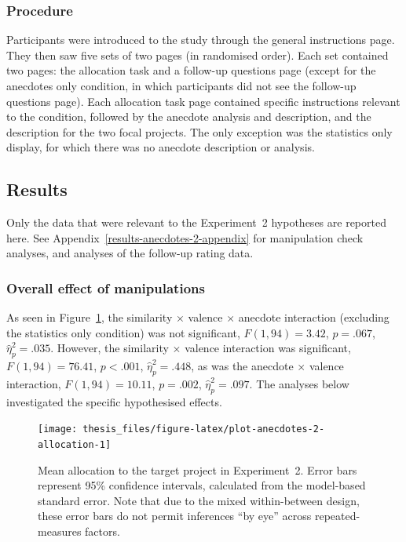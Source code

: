 \documentclass[a4paper, nobind, dvipsnames]{templates/ociamthesis}
\theoremstyle{definition}
\theoremstyle{definition}
\theoremstyle{definition}
\theoremstyle{definition}
\theoremstyle{remark}
\begin{document}
\subsubsection{Procedure}

Participants were introduced to the study through the general instructions page.
They then saw five sets of two pages (in randomised order). Each set contained
two pages: the allocation task and a follow-up questions page (except for the
anecdotes only condition, in which participants did not see the follow-up
questions page). Each allocation task page contained specific instructions
relevant to the condition, followed by the anecdote analysis and description,
and the description for the two focal projects. The only exception was the
statistics only display, for which there was no anecdote description or
analysis.

\subsection{Results}

Only the data that were relevant to the Experiment~2 hypotheses are reported
here. See Appendix~\ref{results-anecdotes-2-appendix} for manipulation check
analyses, and analyses of the follow-up rating data.

\subsubsection{Overall effect of manipulations}

As seen in Figure~\ref{fig:plot-anecdotes-2-allocation}, the similarity
\(\times\) valence \(\times\) anecdote interaction (excluding the statistics only
condition) was not significant,
\(F(1, 94) = 3.42\), \(p = .067\), \(\hat{\eta}^2_p = .035\). However,
the similarity \(\times\) valence interaction was significant,
\(F(1, 94) = 76.41\), \(p < .001\), \(\hat{\eta}^2_p = .448\), as was the anecdote
\(\times\) valence interaction,
\(F(1, 94) = 10.11\), \(p = .002\), \(\hat{\eta}^2_p = .097\). The analyses below investigated the specific hypothesised effects.



\begin{figure}
\texttt{[image: thesis\_files/figure-latex/plot-anecdotes-2-allocation-1]} \caption{Mean allocation to the target project in Experiment~2. Error bars represent 95\% confidence intervals, calculated from the model-based standard error. Note that due to the mixed within-between design, these error bars do not permit inferences ``by eye'' across repeated-measures factors.}\label{fig:plot-anecdotes-2-allocation}
\end{figure}
\end{document}
